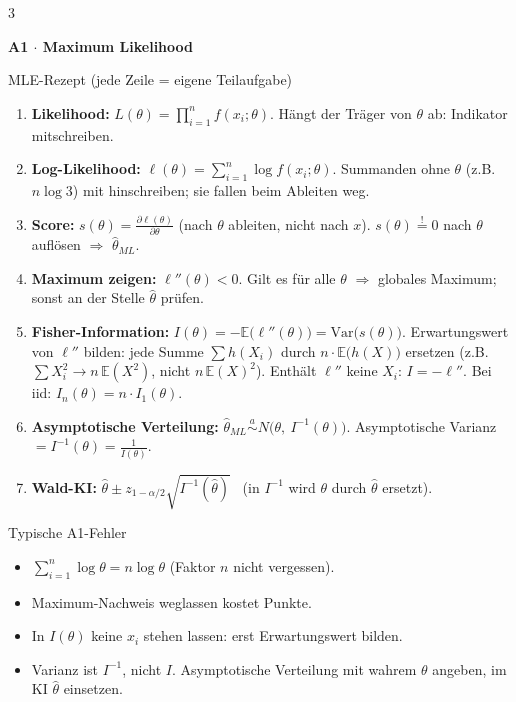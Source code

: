 \documentclass[8pt,a4paper,landscape]{extarticle}
\newcommand{\sect}[1]{\par\vspace{1pt}%
  {\fontsize{10}{11}\selectfont\bfseries #1}\par\nobreak\vspace{1pt}\nobreak}
\newcommand{\E}{\mathbb{E}}
\newcommand{\V}{\mathrm{Var}}
\newcommand{\asim}{\overset{a}{\sim}}
\newcommand{\ra}{$\Rightarrow$}
\begin{document}
\begin{multicols*}{3}
\sect{A1 $\cdot$ Maximum Likelihood}
\begin{rechnen}{MLE-Rezept (jede Zeile = eigene Teilaufgabe)}
\begin{enumerate}[leftmargin=10pt]
\item \textbf{Likelihood:} $L(\theta)=\prod_{i=1}^n f(x_i;\theta)$. Hängt der Träger von $\theta$ ab: Indikator mitschreiben.
\item \textbf{Log-Likelihood:} $\ell(\theta)=\sum_{i=1}^n\log f(x_i;\theta)$. Summanden ohne $\theta$ (z.B.\ $n\log 3$) mit hinschreiben; sie fallen beim Ableiten weg.
\item \textbf{Score:} $s(\theta)=\frac{\partial\ell(\theta)}{\partial\theta}$ (nach $\theta$ ableiten, nicht nach $x$). $s(\theta)\overset{!}{=}0$ nach $\theta$ auflösen \ra{} $\hat\theta_{ML}$.
\item \textbf{Maximum zeigen:} $\ell''(\theta)<0$. Gilt es für alle $\theta$ \ra{} globales Maximum; sonst an der Stelle $\hat\theta$ prüfen.
\item \textbf{Fisher-Information:} $I(\theta)=-\E\big(\ell''(\theta)\big)=\V\big(s(\theta)\big)$. Erwartungswert von $\ell''$ bilden: jede Summe $\sum h(X_i)$ durch $n\cdot\E\big(h(X)\big)$ ersetzen (z.B.\ $\sum X_i^2\to n\,\E(X^2)$, nicht $n\,\E(X)^2$). Enthält $\ell''$ keine $X_i$: $I=-\ell''$. Bei iid: $I_n(\theta)=n\cdot I_1(\theta)$.
\item \textbf{Asymptotische Verteilung:} $\hat\theta_{ML}\asim N\big(\theta,\ I^{-1}(\theta)\big)$. Asymptotische Varianz $=I^{-1}(\theta)=\frac{1}{I(\theta)}$.
\item \textbf{Wald-KI:} $\hat\theta\pm z_{1-\alpha/2}\sqrt{I^{-1}(\hat\theta)}$ \ (in $I^{-1}$ wird $\theta$ durch $\hat\theta$ ersetzt).
\end{enumerate}
\end{rechnen}
\begin{falle}{Typische A1-Fehler}
\begin{itemize}
\item $\sum_{i=1}^n\log\theta=n\log\theta$ (Faktor $n$ nicht vergessen).
\item Maximum-Nachweis weglassen kostet Punkte.
\item In $I(\theta)$ keine $x_i$ stehen lassen: erst Erwartungswert bilden.
\item Varianz ist $I^{-1}$, nicht $I$. Asymptotische Verteilung mit wahrem $\theta$ angeben, im KI $\hat\theta$ einsetzen.

\end{itemize}
\end{falle}
\end{multicols*}
\end{document}
